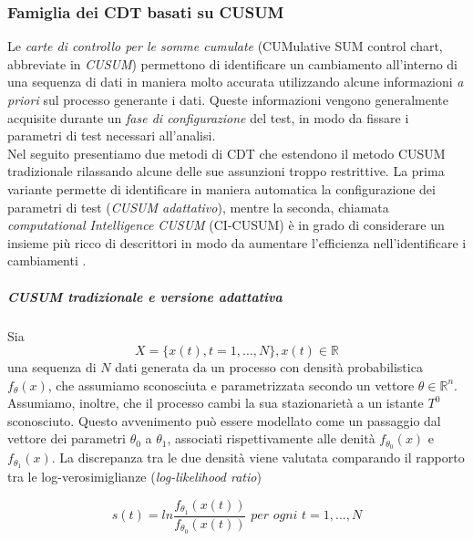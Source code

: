                 \subsubsection{Famiglia dei CDT basati su CUSUM}
                Le \textit{carte di controllo per le somme cumulate} (CUMulative SUM control chart, abbreviate in \textit{CUSUM}) \cite{alippi2014intelligence,ross2009introduction} permettono di identificare un cambiamento all'interno di una sequenza di dati in maniera molto accurata utilizzando alcune informazioni \textit{a priori} sul processo generante i dati. Queste informazioni vengono generalmente acquisite durante un \textit{fase di configurazione} del test, in modo da fissare i parametri di test necessari all'analisi.\\
                Nel seguito presentiamo due metodi di CDT che
                estendono il metodo CUSUM tradizionale rilassando
                alcune delle sue assunzioni troppo restrittive.  La
                prima variante permette di identificare in maniera
                automatica la configurazione dei parametri di test
                (\textit{CUSUM adattativo}), mentre la seconda,
                chiamata \textit{computational Intelligence CUSUM}
                (CI-CUSUM) \`e in grado di considerare un insieme
                pi\`u ricco di descrittori in modo da aumentare
                l'efficienza nell'identificare i cambiamenti
                \cite{alippi2008just}.  \subparagraph{CUSUM
                  tradizionale e versione adattativa}
                Sia \[X=\{x(t),t=1,...,N\},x(t)\in \mathbb{R}\]
                una sequenza di $N$ dati generata da un processo con
                densit\`a probabilistica $f_\theta(x)$, che assumiamo
                sconosciuta e parametrizzata secondo un vettore
                $\theta\in\mathbb{R}^n$. Assumiamo, inoltre, che il
                processo cambi la sua stazionariet\`a a un istante
                $T^0$ sconosciuto. Questo avvenimento pu\`o essere
                modellato come un passaggio dal vettore dei parametri
                $\theta_0$ a $\theta_1$, associati rispettivamente
                alle denit\`a $f_{\theta_0}(x)$ e
                $f_{\theta_1}(x)$. La discrepanza tra le due densit\`a
                viene valutata comparando il rapporto tra le
                log-verosimiglianze (\textit{log-likelihood ratio})
				
                \[
                s(t)=ln\frac{f_{\theta_1}(x(t))}{f_{\theta_0}(x(t))}
                \textit{ per ogni } t=1,...,N \]
							
